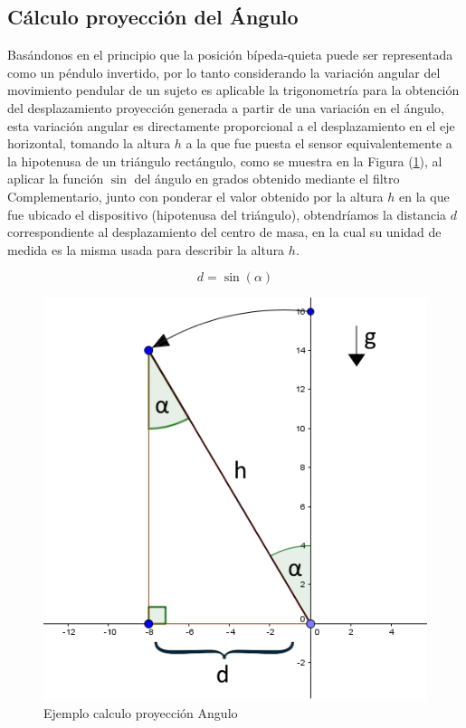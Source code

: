 \documentclass[12pt,a4paper]{article}
\begin{document}
\subsection{Cálculo proyección del Ángulo}
 Basándonos en el principio que la posición bípeda-quieta puede ser representada como un péndulo invertido, por lo tanto considerando la variación angular del movimiento pendular de un sujeto es aplicable la trigonometría para la obtención del desplazamiento proyección generada a partir de una variación en el ángulo, esta variación angular es directamente proporcional a el desplazamiento en el eje horizontal, tomando la altura $h$ a la que fue puesta el sensor equivalentemente a la hipotenusa de un triángulo rectángulo, como se muestra en la Figura (\ref{fig:proyeccion}), al aplicar la función $\sin$ del ángulo en grados obtenido mediante el filtro Complementario, junto con ponderar el valor obtenido por la altura $h$ en la que fue ubicado el dispositivo (hipotenusa del triángulo), obtendríamos la distancia $d$ correspondiente al desplazamiento del centro de masa, en la cual su unidad de medida es la misma usada para describir la altura $h$.
 
 \begin{figure}[H]
\begin{equation}
\label{eq:proyeccion}
d=\sin(\alpha)
\end{equation}
\end{figure}

  \begin{figure}[H]
  \centering
      \includegraphics[scale=0.5]{images/calculoProyeccion}
      \caption{Ejemplo calculo proyección Angulo}
      \label{fig:proyeccion}
  \end{figure}
  
\end{document}
